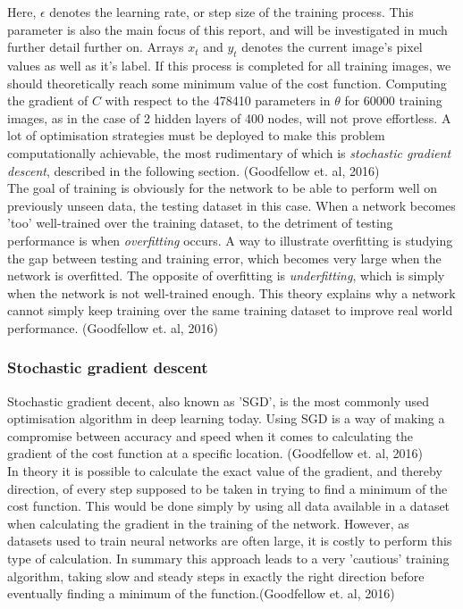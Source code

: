 \documentclass{article}
\begin{document}
\noindent Here, $\epsilon$ denotes the learning rate, or step size of the training process. This parameter is also the main focus of this report, and will be investigated in much further detail further on. Arrays $x_t$ and $y_t$ denotes the current image's pixel values as well as it's label. If this process is completed for all training images, we should theoretically reach some minimum value of the cost function. Computing the gradient of $C$ with respect to the 478410 parameters in $\theta$ for 60000 training images, as in the case of 2 hidden layers of 400 nodes, will not prove effortless. A lot of optimisation strategies must be deployed to make this problem computationally achievable, the most rudimentary of which is \textit{stochastic gradient descent}, described in the following section. (Goodfellow et. al, 2016)\\

\noindent The goal of training is obviously for the network to be able to perform well on previously unseen data, the testing dataset in this case. When a network becomes 'too' well-trained over the training dataset, to the detriment of testing performance is when \textit{overfitting} occurs. A way to illustrate overfitting is studying the gap between testing and training error, which becomes very large when the network is overfitted. The opposite of overfitting is \textit{underfitting}, which is simply when the network is not well-trained enough. This theory explains why a network cannot simply keep training over the same training dataset to improve real world performance. (Goodfellow et. al, 2016)


\subsubsection{Stochastic gradient descent}\label{sec: SGD}

Stochastic gradient decent, also known as 'SGD', is the most commonly used optimisation algorithm in deep learning today. Using SGD is a way of making a compromise between accuracy and speed when it comes to calculating the gradient of the cost function at a specific location. (Goodfellow et. al, 2016)\\

\noindent In theory it is possible to calculate the exact value of the gradient, and thereby direction, of every step supposed to be taken in trying to find a minimum of the cost function. This would be done simply by using all data available in a dataset when calculating the gradient in the training of the network. However, as datasets used to train neural networks are often large, it is costly to perform this type of calculation. In summary this approach leads to a very 'cautious' training algorithm, taking slow and steady steps in exactly the right direction before eventually finding a minimum of the function.(Goodfellow et. al, 2016)\\
\end{document}
